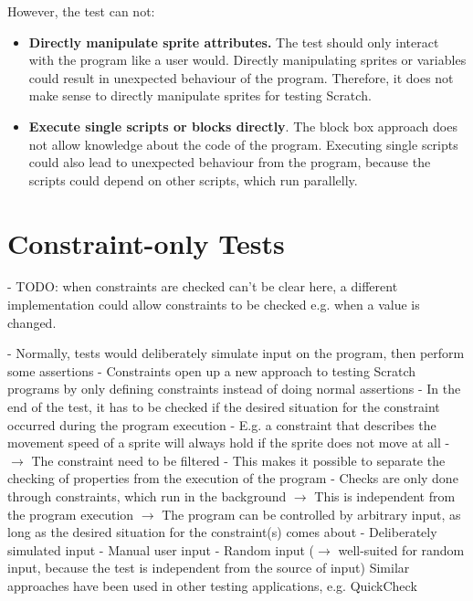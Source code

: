However, the test can not:
\begin{itemize}
    \item \textbf{Directly manipulate sprite attributes.}
        The test should only interact with the program like a user would.
        Directly manipulating sprites or variables could result in unexpected behaviour of the program.
        Therefore, it does not make sense to directly manipulate sprites for testing Scratch.
    \item \textbf{Execute single scripts or blocks directly}.
        The block box approach does not allow knowledge about the code of the program.
        Executing single scripts could also lead to unexpected behaviour from the program, because the scripts could depend on other scripts, which run parallelly.
\end{itemize}

\section{Constraint-only Tests}%
\label{sec:constraint_only_tests}

- TODO: when constraints are checked can't be clear here, a different implementation could allow constraints to be checked e.g. when a value is changed.

- Normally, tests would deliberately simulate input on the program, then perform some assertions
- Constraints open up a new approach to testing Scratch programs by only defining constraints instead of doing normal assertions
- In the end of the test, it has to be checked if the desired situation for the constraint occurred during the program execution
    - E.g. a constraint that describes the movement speed of a sprite will always hold if the sprite does not move at all
    - $\rightarrow$ The constraint need to be filtered
- This makes it possible to separate the checking of properties from the execution of the program
    - Checks are only done through constraints, which run in the background
    $\rightarrow$ This is independent from the program execution
    $\rightarrow$ The program can be controlled by arbitrary input, as long as the desired situation for the constraint(s) comes about
        - Deliberately simulated input
        - Manual user input
        - Random input ($\rightarrow$ well-suited for random input, because the test is independent from the source of input)
          Similar approaches have been used in other testing applications, e.g. QuickCheck \cite{quickcheck}

